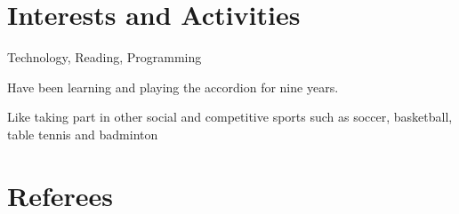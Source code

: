 \documentclass[a4paper,10pt]{article} %
\begin{document}

\section{Interests and Activities}
Technology, Reading, Programming

Have been learning and playing the accordion for nine years.

Like taking part in other social and competitive sports such as soccer, basketball, table tennis and badminton

\section{Referees}
\end{document}
